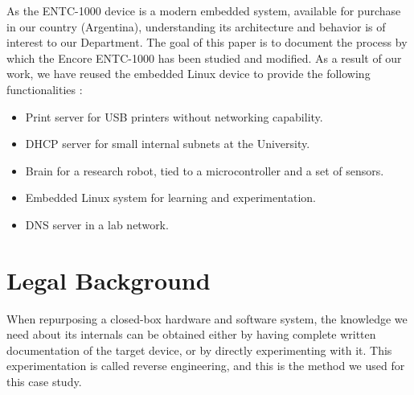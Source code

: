 \documentclass[conference]{IEEEtran}
\newcommand{\nota}[1]{}
\begin{document}
\nota{Es de interés para nuestra facultad el entendimiento de la arquitectura y funcionamiento
de los dispositivos ENTC-1000,
ya que se trata de un sistema embebido moderno, y disponible
para su adquisición en el país. Conocer su funcionamiento interno
nos permite la experimentación académica con Linux embebido. Y,
por último, pero no menos importante, permite su reuso para necesidades
específicas en el marco de los sistemas embebidos.
}

As the ENTC-1000 device is a modern embedded system, available for purchase in
our country (Argentina), understanding its architecture and behavior is of interest to our Department.  
The goal of this paper is to document the process by which the Encore ENTC-1000
has been studied and modified. As a result of our work,
we have reused the embedded Linux device to provide the following functionalities :

\begin{itemize}
\item Print server for USB printers without networking capability. 
\item DHCP server for small internal subnets at the University. 
\item Brain for a research robot, tied to a microcontroller and a set of sensors. 
\item Embedded Linux system for learning and experimentation.  
\item DNS server in a lab network.  
\end{itemize}


\section{Legal Background}

\nota{ Marco Jurídico }

\nota{Cuando reutilizamos un sistema embebido de hardware y software cerrado, necesitamos la
documentación completa de las especificaciones del dispositivo.
Si esa documentación no existe, o si no existe
completamente, es necesario descubrir su funcionamiento mediante
diferentes pruebas. Este último método es el elegido en este artículo, y es lo que 
se denomina ingeniería inversa.}

When repurposing a closed-box hardware and software system, the knowledge we need about its internals can be obtained either by having complete written documentation of the target device, or by directly experimenting with it. This experimentation is called reverse engineering, and this is the method we used for this case study.
\end{document}

